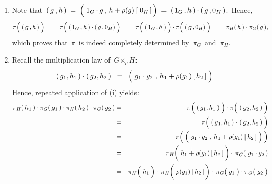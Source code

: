 \begin{enumerate}
\item
	Note that
	\,$(\,g\,,h\,)
	\;=\;
		\left(\;1_{G} \cdot g\,,\, h + \rho(g)\,[\;\overset{{\color{white}.}}{0_{H}}\,]\,\right)
	\;=\;
		(\,1_{G}\,,h\,)\cdot (\,g\,,0_{H}\,)
	$.\,
	Hence,
	\begin{equation*}
	\pi\!\left(\;(\,\overset{{\color{white}1}}{g}\,,h\,)\;\right)
	\;\; = \;\;
		\pi\!\left(\;
			(\,1_{G}\,,h\,)
			\cdot
			(\,\overset{{\color{white}1}}{g}\,,0_{H})
			\;\right)
	\;\; = \;\;
		\pi\!\left(\;
			(\,1_{G}\,,\overset{{\color{white}.}}{h}\,)
			\;\right)
		\cdot
		\pi\!\left(\;
			(\,\overset{{\color{white}.}}{g}\,,\overset{{\color{white}.}}{0_{H}})
			\;\right)
	\;\; = \;\;
		\pi_{H}(\,h\,) \cdot \pi_{G}(\,g\,),
	\end{equation*}
	which proves that \,$\pi$\, is indeed completely determined by
	\,$\pi_{G}$\, and \,$\pi_{H}$.\,
\item
	Recall the multiplication law of \,$G \ltimes_{\rho}\! H$:\,
	\begin{equation*}
	(\,g_{1},h_{1}\,) \cdot (\,g_{2},h_{2}\,)
	\;\; = \;\;
		\left(\;
			\overset{{\color{white}1}}{g_{1}} \cdot g_{2}
			\;\overset{{\color{white}1}}{,}\;
			h_{1} + \rho(g_{1})\,[\,h_{2}\,]
			\;\right)
	\end{equation*}
	Hence, repeated application of (i) yields:
	\begin{eqnarray*}
	\pi_{H}(\,h_{1}\,) \cdot \pi_{G}(\,g_{1}\,)
	\cdot
	\pi_{H}(\,h_{2}\,) \cdot \pi_{G}(\,g_{2}\,)
	& = &
		\pi\!\left(\;
			(\,\overset{{\color{white}1}}{g_{1}},h_{1}\,)
			\;\right)
		\cdot
		\pi\!\left(\;
			(\,\overset{{\color{white}1}}{g_{2}},h_{2}\,)
			\;\right)
	\\
	& = &
		\pi\!\left(\;
			(\,g_{1},h_{1}\,) \overset{{\color{white}1}}{\cdot} (\,g_{2},h_{2}\,)
			\;\right)
	\\
	& = &
		\pi\!\left(\;
			\left(\;
				\overset{{\color{white}1}}{g_{1}} \cdot g_{2}
				\;\overset{{\color{white}1}}{,}\;
				h_{1} + \rho(g_{1})\,[\,h_{2}\,]
				\;\right)
			\;\right)
	\\
	& = &
		\pi_{H}\!\left(\;h_{1} \overset{{\color{white}1}}{+} \rho(g_{1})\,[\,h_{2}\,]\,\right)
		\cdot\,
		\pi_{G}(\;g_{1}\cdot g_{2}\,)
	\\
	& = &
		\pi_{H}\!\left(\;\overset{{\color{white}.}}{h_{1}}\;\right)
		\cdot\,
		\pi_{H}\!\left(\;\overset{{\color{white}1}}{\rho(g_{1})}\,[\,h_{2}\,]\,\right)
		\cdot\,
		\pi_{G}\!\left(\;\overset{{\color{white}.}}{g_{1}}\;\right)
		\cdot
		\pi_{G}\!\left(\;\overset{{\color{white}.}}{g_{2}}\;\right)

\end{eqnarray*}
\end{enumerate}
